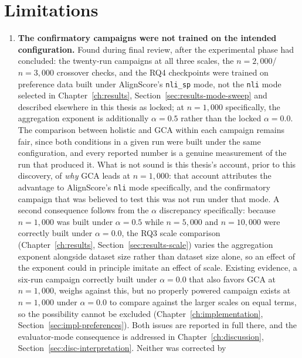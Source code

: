 \section{Limitations}
\label{sec:concl-limitations}

\begin{enumerate}
  \item \label{lim:wrong-configuration}
    \textbf{The confirmatory campaigns were not trained on the intended
    configuration.} Found during final review, after the experimental
    phase had concluded: the twenty-run campaigns at all three scales, the
    $n=2{,}000$/$n=3{,}000$ crossover checks, and the RQ4 checkpoints were
    trained on preference data built under AlignScore's \texttt{nli\_sp}
    mode, not the \texttt{nli} mode selected in
    Chapter~\ref{ch:results}, Section~\ref{sec:results-mode-sweep} and
    described elsewhere in this thesis as locked; at $n=1{,}000$
    specifically, the aggregation exponent is additionally $\alpha=0.5$
    rather than the locked $\alpha=0.0$. The comparison between holistic
    and GCA within each campaign remains fair, since both conditions in a
    given run were built under the same configuration, and every reported
    number is a genuine measurement of the run that produced it. What is
    not sound is this thesis's account, prior to this discovery, of
    \emph{why} GCA leads at $n=1{,}000$: that account attributes the
    advantage to AlignScore's \texttt{nli} mode specifically, and the
    confirmatory campaign that was believed to test this was not run under
    that mode. A second consequence follows from the $\alpha$ discrepancy
    specifically: because $n=1{,}000$ was built under $\alpha=0.5$ while
    $n=5{,}000$ and $n=10{,}000$ were correctly built under $\alpha=0.0$,
    the RQ3 scale comparison (Chapter~\ref{ch:results},
    Section~\ref{sec:results-scale}) varies the aggregation exponent
    alongside dataset size rather than dataset size alone, so an effect of
    the exponent could in principle imitate an effect of scale. Existing
    evidence, a six-run campaign correctly built under $\alpha=0.0$ that
    also favors GCA at $n=1{,}000$, weighs against this, but no properly
    powered campaign exists at $n=1{,}000$ under $\alpha=0.0$ to compare
    against the larger scales on equal terms, so the possibility cannot be
    excluded (Chapter~\ref{ch:implementation},
    Section~\ref{sec:impl-preferences}). Both issues are reported in full
    there, and the evaluator-mode consequence is
    addressed in Chapter~\ref{ch:discussion},
    Section~\ref{sec:disc-interpretation}. Neither was corrected by

\end{enumerate}
